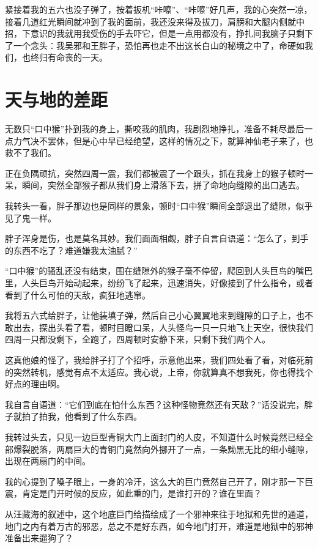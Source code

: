 紧接着我的五六也没子弹了，按着扳机“咔嚓”、“咔嚓”好几声，我的心突然一凉，接着几道红光瞬间就冲到了我的面前，我还没来得及拔刀，肩膀和大腿内侧就中招，下意识的我就用我受伤的手去吓它，但是一点用都没有，挣扎间我脑子只剩下了一个念头：我吴邪和王胖子，恐怕再也走不出这长白山的秘境之中了，命硬如我们，也终归有命丧的一天。

\chapter{天与地的差距}

无数只“口中猴”扑到我的身上，撕咬我的肌肉，我剧烈地挣扎，准备不耗尽最后一点力气决不罢休，但是心中早已经绝望，这样的情况之下，就算神仙老子来了，也救不了我们。

正在负隅顽抗，突然四周一震，我们都被震了一个跟头，抓在我身上的猴子顿时一呆，瞬间，突然全部猴子都从我们身上滑落下去，拼了命地向缝隙的出口逃去。

我转头一看，胖子那边也是同样的景象，顿时“口中猴”瞬间全部退出了缝隙，似乎见了鬼一样。

胖子浑身是伤，也是莫名其妙。我们面面相觑，胖子自言自语道：“怎么了，到手的东西不吃了？难道嫌我太油腻？”

“口中猴”的骚乱还没有结束，围在缝隙外的猴子毫不停留，爬回到人头巨鸟的嘴巴里，人头巨鸟开始动起来，纷纷飞了起来，迅速消失，好像接到了什么指令，或者看到了什么可怕的天敌，疯狂地逃窜。

我将五六式给胖子，让他装填子弹，然后自己小心翼翼地来到缝隙的口子上，也不敢出去，探出头看了看，顿时目瞪口呆，人头怪鸟一只一只地飞上天空，很快我们四周一只都没剩下，全跑了，四周顿时安静下来，只剩下我们两个人。

这真他娘的怪了，我给胖子打了个招呼，示意他出来，我们四处看了看，对临死前的突然转机，感觉有点不太适应。我心说，上帝，你就算真不想我死，你也得找个好点的理由啊。

我自言自语道：“它们到底在怕什么东西？这种怪物竟然还有天敌？”话没说完，胖子就拍了拍我，他看到了什么东西。

我转过头去，只见一边巨型青铜大门上面封门的人皮，不知道什么时候竟然已经全部爆裂脱落，两扇巨大的青铜门竟然向外挪开了一点，一条黝黑无比的细小缝隙，出现在两扇门的中间。

我的心提到了嗓子眼上，一身的冷汗，这么大的巨门竟然自己开了，刚才那一下巨震，肯定是门开时候的反应，如此重的门，是谁打开的？谁在里面？

从汪藏海的叙述中，这个地底巨门给描绘成了一个邪神来往于地狱和先世的通道，地门之内有着万古的邪恶，总之不是好东西，如今地门打开，难道是地狱中的邪神准备出来遛狗了？

